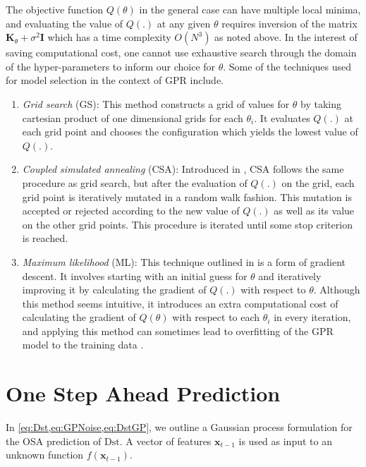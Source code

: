 The objective function $Q(\theta)$ in the general case can have multiple local minima, and 
evaluating the value of $Q(.)$ at any given $\theta$ requires inversion of the matrix 
$\mathbf{K}_\theta + \sigma^{2} \mathbf{I}$ which has a time complexity $O(N^3)$ as noted above. 
In the interest of saving computational cost, one cannot use exhaustive search through the domain 
of the hyper-parameters to inform our choice for $\theta$. Some of the techniques used for model 
selection in the context of GPR include.

\begin{enumerate}
\item \emph{Grid search} (GS): This method constructs a grid of values for $\theta$ by taking 
      cartesian product of one dimensional grids for each $\theta_i$. It evaluates $Q(.)$ at each 
      grid point and chooses the configuration which yields the lowest value of $Q(.)$.

\item \emph{Coupled simulated annealing} (CSA): Introduced in \citet{Xavier-De-Souza2010}, CSA 
      follows the same procedure as grid search, but after the evaluation of $Q(.)$ on the grid, 
      each grid point is iteratively mutated in a random walk fashion. This mutation is 
      accepted or rejected according to the new value of $Q(.)$ as well as its value on the other 
      grid points. This procedure is iterated until some stop criterion is reached.

\item \emph{Maximum likelihood} (ML): This technique outlined in 
      \citet{Rasmussen:2005:GPM:1162254} is a form of gradient descent. It involves starting with 
      an initial guess for $\theta$ and iteratively improving it by calculating the gradient of 
      $Q(.)$ with respect to $\theta$. Although this method seems intuitive, it introduces an 
      extra computational cost of calculating the gradient of $Q(\theta)$ with respect to each 
      $\theta_i$ in every iteration, and applying this method can sometimes lead to overfitting of 
      the GPR model to the training data \citep[ch.~5,sec.~5.2]{Rasmussen:2005:GPM:1162254}.
\end{enumerate}

\section{One Step Ahead Prediction} \label{sec:osa}

In \cref{eq:Dst,eq:GPNoise,eq:DstGP}, we outline a Gaussian process formulation for the 
OSA prediction of $ \mathrm{Dst}$. A vector of features $\mathbf{x}_{t-1}$ is used as input 
to an unknown function $f(\mathbf{x}_{t-1})$.

